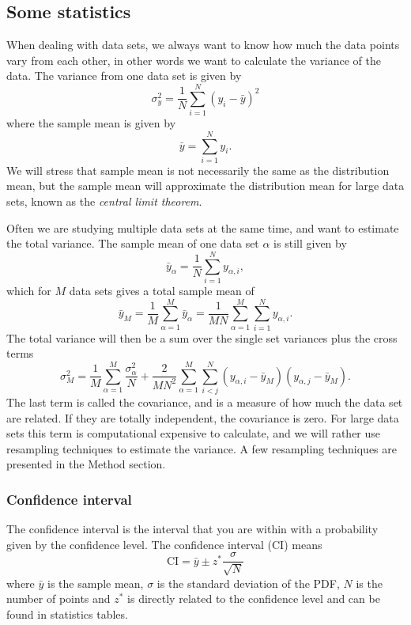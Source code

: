\subsection{Some statistics} \label{sec:statistics}
When dealing with data sets, we always want to know how much the data points vary from each other, in other words we want to calculate the variance of the data. The variance from one data set is given by 
\begin{equation}
\sigma_y^2=\frac{1}{N}\sum_{i=1}^N(y_i-\bar{y})^2
\end{equation}
where the sample mean is given by
\begin{equation}
\bar{y}=\sum_{i=1}^Ny_i.
\end{equation}
We will stress that sample mean is not necessarily the same as the distribution mean, but the sample mean will approximate the distribution mean for large data sets, known as the \textit{central limit theorem}. \cite{StatMek}

Often we are studying multiple data sets at the same time, and want to estimate the total variance. The sample mean of one data set $\alpha$ is still given by
\begin{equation}
\bar{y}_{\alpha}=\frac{1}{N}\sum_{i=1}^Ny_{\alpha,i},
\end{equation}
which for $M$ data sets gives a total sample mean of
\begin{equation}
\bar{y}_M=\frac{1}{M}\sum_{\alpha=1}^M\bar{y}_{\alpha}=\frac{1}{MN}\sum_{\alpha=1}^M\sum_{i=1}^Ny_{\alpha,i}.
\end{equation}
The total variance will then be a sum over the single set variances plus the cross terms
\begin{equation}
\sigma_M^2=\frac{1}{M}\sum_{\alpha=1}^M\frac{\sigma_{\alpha}^2}{N}+\frac{2}{MN^2}\sum_{\alpha=1}^M\sum_{i<j}^N(y_{\alpha,i}-\bar{y}_M)(y_{\alpha,j}-\bar{y}_M).
\end{equation}
The last term is called the covariance, and is a measure of how much the data set are related. If they are totally independent, the covariance is zero. For large data sets this term is computational expensive to calculate, and we will rather use resampling techniques to estimate the variance. A few resampling techniques are presented in the Method section.

\subsubsection{Confidence interval} \label{sec:confidence}
The confidence interval is the interval that you are within with a probability given by the confidence level. The confidence interval (CI) means
\begin{equation}
\text{CI}=\bar{y}\pm z^*\frac{\sigma}{\sqrt{N}}
\end{equation}
where $\bar{y}$ is the sample mean, $\sigma$ is the standard deviation of the PDF, $N$ is the number of points and $z^*$ is directly related to the confidence level and can be found in statistics tables. 

